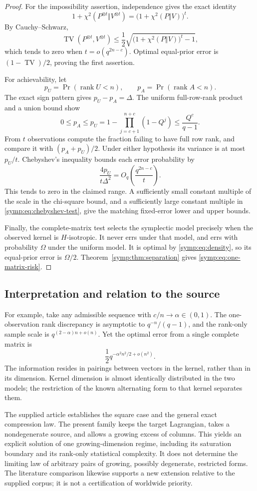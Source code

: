 \begin{proof}
For the impossibility assertion, independence gives the exact identity
\[
 1+\chi^2(P^{\otimes t}\Vert V^{\otimes t})
  =\bigl(1+\chi^2(P\Vert V)\bigr)^t.
\]
By Cauchy--Schwarz,
\[
 \operatorname{TV}(P^{\otimes t},V^{\otimes t})
 \le\frac12\sqrt{\bigl(1+\chi^2(P\Vert V)\bigr)^t-1},
\]
which tends to zero when $t=o(q^{2n-c})$.  Optimal equal-prior error is
$(1-\operatorname{TV})/2$, proving the first assertion.

For achievability, let
\[
 p_U=\Pr(\operatorname{rank}U<n),\qquad
 p_A=\Pr(\operatorname{rank}A<n).
\]
The exact sign pattern gives $p_U-p_A=\Delta$.  The uniform full-row-rank
product and a union bound show
\[
 0\le p_A\le p_U
   =1-\prod_{j=c+1}^{n+c}(1-Q^j)
   \le\frac{Q^c}{q-1}.
\]
From $t$ observations compute the fraction failing to have full row rank,
and compare it with $(p_A+p_U)/2$.  Under either hypothesis its variance is
at most $p_U/t$.  Chebyshev's inequality bounds each error probability by
\begin{equation}
 \frac{4p_U}{t\Delta^2}
   =O_q\left(\frac{q^{2n-c}}t\right).
 \label{symp:eq:chebyshev-test}
\end{equation}
This tends to zero in the claimed range.  A sufficiently small constant
multiple of the scale in the chi-square bound, and a sufficiently large
constant multiple in \eqref{symp:eq:chebyshev-test}, give the matching
fixed-error lower and upper bounds.

Finally, the complete-matrix test selects the symplectic model precisely
when the observed kernel is $H$-isotropic.  It never errs under that model,
and errs with probability $\Omega$ under the uniform model.  It is optimal
by \eqref{symp:eq:density}, so its equal-prior error is $\Omega/2$.
Theorem~\ref{symp:thm:separation} gives
\eqref{symp:eq:one-matrix-risk}.
\end{proof}

\subsection{Interpretation and relation to the source}

For example, take any admissible sequence with $c/n\to\alpha\in(0,1)$.
The one-observation rank discrepancy is asymptotic to
$q^{-n}/(q-1)$, and the rank-only sample scale is
$q^{(2-\alpha)n+o(n)}$.  Yet the optimal error from a single complete matrix
is
\[
 \frac12q^{-\alpha^2n^2/2+o(n^2)}.
\]
The information resides in pairings between vectors in the kernel, rather
than in its dimension.  Kernel dimension is almost identically distributed
in the two models; the restriction of the known alternating form to that
kernel separates them.

The supplied article establishes the square case and the general exact
compression law.  The present family keeps the target Lagrangian, takes a
nondegenerate source, and allows a growing excess of columns.  This yields
an explicit solution of one growing-dimension regime, including its
saturation boundary and its rank-only statistical complexity.  It does not
determine the limiting law of arbitrary pairs of growing, possibly
degenerate, restricted forms.  The literature comparison likewise supports
a new extension relative to the supplied corpus; it is not a certification
of worldwide priority.
